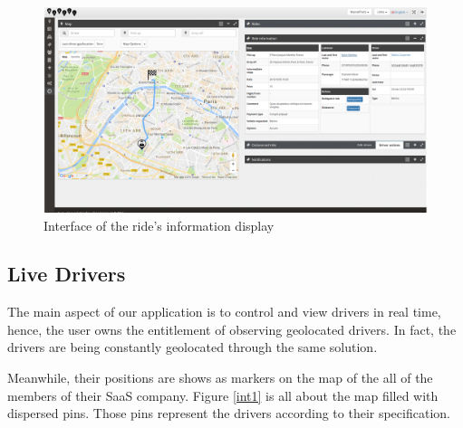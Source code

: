 \begin{figure}[!htbp] 
\begin{center}
\includegraphics[width=6 in]{images/achievement/6.png}
\caption{Interface of the ride's information display }
\label{int6}
\end{center}
\end{figure}

\newpage


\subsection{Live Drivers}

The main aspect of our application is to control and view drivers in real time, hence, the user owns the entitlement of observing geolocated drivers. In fact, the drivers are being constantly geolocated through the same solution.

Meanwhile, their positions are shows as markers on the map of the all of the members of their SaaS company. Figure \ref{int1} is all about the map filled with dispersed pins. Those pins represent the drivers according to their specification.

~


